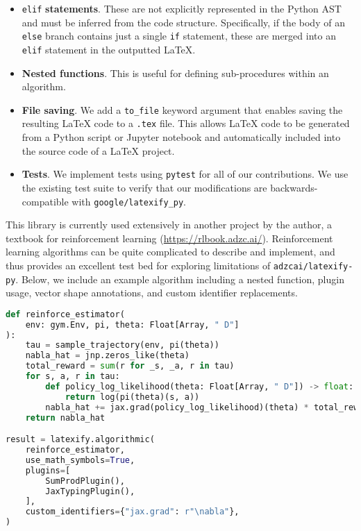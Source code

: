 \documentclass{article}
\newcommand{\ourpkg}{\texttt{adzcai/latexify-py}}
\newcommand{\theirpkg}{\texttt{google/latexify\_py}}
\newcommand{\vocab}[1]{\textbf{#1}}
\begin{document}
\begin{itemize}
    \item \verb|elif| \vocab{statements}. These are not explicitly represented in the Python AST and must be inferred from the code structure.
        Specifically, if the body of an \verb|else| branch contains just a single \verb|if| statement,
        these are merged into an \verb|elif| statement in the outputted \LaTeX{}.
    \item \vocab{Nested functions}. This is useful for defining sub-procedures within an algorithm.
    \item \vocab{File saving}. We add a \verb|to_file| keyword argument that enables saving the resulting \LaTeX{} code
        to a \verb|.tex| file.
        This allows \LaTeX{} code to be generated from a Python script or Jupyter notebook and automatically included into the source code of a \LaTeX{} project.
    \item \vocab{Tests}. We implement tests using \verb|pytest| for all of our contributions.
        We use the existing test suite to verify that our modifications are backwards-compatible with \theirpkg{}.
\end{itemize}

This library is currently used extensively in another project by the author,
a textbook for reinforcement learning (\url{https://rlbook.adzc.ai/}).
Reinforcement learning algorithms can be quite complicated to describe and implement,
and thus provides an excellent test bed for exploring limitations of \ourpkg{}.
Below, we include an example algorithm including a nested function,
plugin usage,
vector shape annotations,
and custom identifier replacements.

\begin{lstlisting}[language=Python]
def reinforce_estimator(
    env: gym.Env, pi, theta: Float[Array, " D"]
):
    tau = sample_trajectory(env, pi(theta))
    nabla_hat = jnp.zeros_like(theta)
    total_reward = sum(r for _s, _a, r in tau)
    for s, a, r in tau:
        def policy_log_likelihood(theta: Float[Array, " D"]) -> float:
            return log(pi(theta)(s, a))
        nabla_hat += jax.grad(policy_log_likelihood)(theta) * total_reward
    return nabla_hat

result = latexify.algorithmic(
    reinforce_estimator,
    use_math_symbols=True,
    plugins=[
        SumProdPlugin(),
        JaxTypingPlugin(),
    ],
    custom_identifiers={"jax.grad": r"\nabla"},
)
\end{lstlisting}
\end{document}
